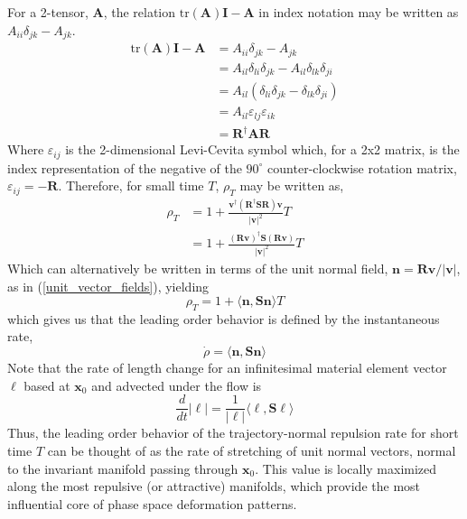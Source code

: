 \documentclass[twocolumn]{svjour3}
\begin{document}
For a 2-tensor, \(\mathbf{A}\), the relation \(\text{tr}(\mathbf{A})\mathbf{I}-\mathbf{A}\) in index notation may be written as \(A_{ii}\delta_{jk} - A_{jk}\).
\begin{equation}
\begin{aligned}
\text{tr}(\mathbf{A})\mathbf{I}-\mathbf{A} &= A_{ii}\delta_{jk} - A_{jk} \\
&= A_{il}\delta_{li}\delta_{jk} - A_{il}\delta_{lk}\delta_{ji} \\
&= A_{il}(\delta_{li}\delta_{jk} - \delta_{lk}\delta_{ji}) \\ 
&= A_{il}\varepsilon_{lj}\varepsilon_{ik} \\
&= \mathbf{R}^\dagger\mathbf{A}\mathbf{R}
\end{aligned}
\end{equation}
Where \(\varepsilon_{ij}\) is the 2-dimensional Levi-Cevita symbol which, for a 2x2 matrix, is the index representation of the negative of the $90^\circ$ counter-clockwise rotation matrix,  $\varepsilon_{ij} = -\mathbf{R}$. Therefore, for small time $T$, \(\rho_T\) may be written as,
\begin{equation}
\begin{aligned}
\rho_T &= 1+ \frac{\mathbf{v}^\dagger(\mathbf{R}^\dagger\mathbf{S}\mathbf{R})\mathbf{v}}{\left|\mathbf{v}\right|^2}T \\
& = 1+ \frac{(\mathbf{R}\mathbf{v})^\dagger\mathbf{S}(\mathbf{R}\mathbf{v})}{\left|\mathbf{v}\right|^2}T 
\end{aligned}
\end{equation}
Which can  alternatively be written in terms of the unit normal field, \(\mathbf{n} = \mathbf{R}\mathbf{v}/\left|\mathbf{v}\right|\), as in (\ref{unit_vector_fields}), yielding
\begin{equation}
\rho_T 
= 1+ \langle \mathbf{n},\mathbf{S}\mathbf{n} \rangle T 
\end{equation}	
which gives us that the leading order behavior is defined by the instantaneous rate,
\begin{equation}	
\dot \rho = \langle \mathbf{n},\mathbf{S}\mathbf{n} \rangle
\end{equation}
Note that the rate of length change for an infinitesimal material element vector $\ell$ based at $\mathbf{x}_0$ and advected under the flow is
\begin{equation}
\frac{d}{dt} |\ell| = \frac{1}{| \ell |} \langle \ell,\mathbf{S}\ell \rangle
\end{equation}	
Thus, the leading order behavior of the trajectory-normal repulsion rate for short time \(T\) can be thought of as the rate  of stretching of unit normal vectors, normal to the invariant manifold passing through $\mathbf{x}_0$.
This value is locally maximized along the most repulsive (or attractive) manifolds, which provide the most influential core of phase space deformation patterns.
\end{document}
